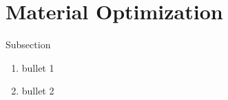 \section{Material Optimization}
\begin{frame}{Subsection}
    \begin{enumerate}
           \item bullet 1
    \pause \item bullet 2
    \end{enumerate}
\end{frame}
